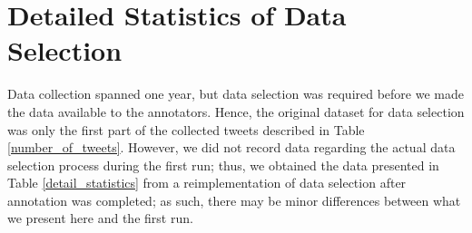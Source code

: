 \documentclass[english]{jnlp_1.4}
\begin{document}
\appendix


\section{Detailed Statistics of Data Selection}

\noindent Data collection spanned one year, but data selection was required before we made the data available to the annotators. Hence, the original dataset for data selection was only the first part of the collected tweets described in Table \ref{number_of_tweets}. However, we did not record data regarding the actual data selection process during the first run; thus, we obtained the data presented in Table \ref{detail_statistics} from a reimplementation of data selection after annotation was completed; as such, there may be minor differences between what we present here and the first run.

\begin{table}[p]
\label{detail_statistics}

\end{table}
\end{document}
